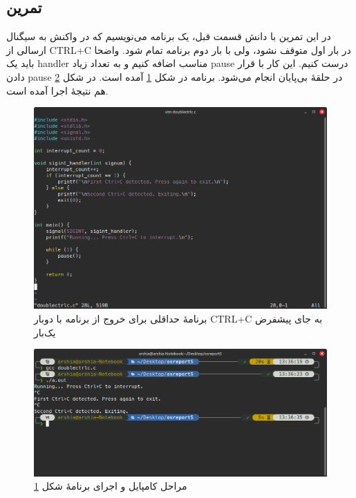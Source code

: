 \documentclass[12pt]{article}
\begin{document}
	\subsection{تمرین}
	در این تمرین با دانش قسمت قبل، یک برنامه می‌نویسیم که در واکنش به سیگنال ارسالی از \textenglish{CTRL+C} در بار اول متوقف نشود، ولی با بار دوم برنامه تمام شود. واضحا باید یک handler مناسب اضافه کنیم و به تعداد زیاد pause درست کنیم. این کار با قرار دادن pause در حلقهٔ بی‌پایان انجام می‌شود. برنامه در شکل \ref{img:13} آمده است. در شکل \ref{img:14} هم نتیجهٔ اجرا آمده است.
	\begin{figure}[H]
		\centering
		\includegraphics[width=\textwidth]{report5-resources/13.png}
		\caption{برنامهٔ حداقلی برای خروج از برنامه با دوبار \textenglish{CTRL+C} به جای پیشفرض یک‌بار}
		\label{img:13}
	\end{figure}
	\begin{figure}[H]
		\centering
		\includegraphics[width=\textwidth]{report5-resources/14.png}
		\caption{مراحل کامپایل و اجرای برنامهٔ شکل \ref{img:13}}
		\label{img:14}
	\end{figure}
        
	\newpage
	\begin{LTR}
		\printbibliography[title={مراجع}]
	\end{LTR}

	
\end{document}
